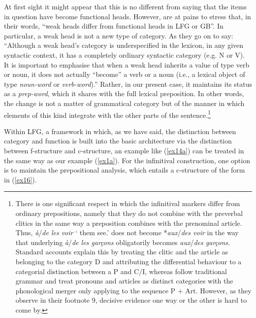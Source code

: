 \documentclass[output=paper]{langsci/langscibook}
\begin{document}
At first sight it might appear that this is no different from saying that the
items in question have become functional heads. However, \cite[note
12]{Abeilleetal06} are at pains to stress that, in their words, \enquote{weak heads
differ from functional heads in \gls{LFG} or GB}. In particular, a weak head is not a new type of
category. As they go on to say: ``Although a weak head's category is
underspecified in the lexicon, in any given syntactic context, it has a
completely ordinary syntactic category (e.g. N or V).
It is important to emphasise that when a weak head inherits a value of type
verb or noun, it does not actually ``become'' a verb or a noun (i.e., a lexical
object of type \emph{noun-word} or \emph{verb-word}).'' Rather, in our present
case, it maintains its status as a \emph{prep-word}, which it shares with the
full lexical preposition. In other words, the change is not a matter of
grammatical category but of the manner in which elements of this kind integrate
with the other parts of the sentence.\footnote{There is one significant respect
    in which the infinitival markers differ from ordinary prepositions, namely
    that they do not combine with the preverbal clitics in the same
    way a preposition combines with the prenominal article. Thus,
    \emph{\`a}/\emph{de les voir} `\Comp{} them see.\Inf{}' does not become
    *\emph{aux}/\emph{des voir} in the way that underlying \emph{\`a}/\emph{de
    les gar\c{c}ons} obligatorily becomes \emph{aux}/\emph{des gar\c{c}ons}.
    Standard accounts explain this by treating the clitic and the article as
    belonging to the category D and attributing the differential behaviour to a
    categorial distinction between a P and C/I, whereas
    \citeauthor{Abeilleetal06}  follow traditional grammar and treat pronouns
    and articles as distinct categories with the phonological merger only
applying to the sequence P $+$ Art. However, as they observe in their footnote 9,
decisive evidence one way or the other is hard to come by.}\largerpage

Within \gls{LFG}, a framework in which, as we have said, the distinction
between category and function is built into the basic architecture via the
distinction be\-tween f-structure and c-structure, an example like (\ref{ex14a})
can be treated in the same way as our  example (\ref{ex1a}). For the
infinitival construction, one option is to maintain the prepositional analysis,
which entails a c-structure of the form in (\ref{ex16}).
\end{document}
